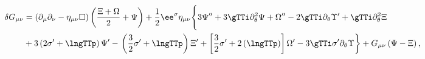 \begin{equation}
\begin{aligned}
\delta G_{\mu \nu} & = \left(\partial_\mu \partial_\nu - \eta_{\mu
\nu} \Box \right) \left( \frac{\Xi + \Omega}{2} + \Psi \right) +
\frac{1}{2} \ee^\sigma \eta_{\mu \nu} \Bigg\{3 \Psi'' + 3 \gTTi
\partial^2_\theta \Psi + \Omega'' - 2 \gTTi \partial_\theta \Upsilon' +
\gTTi \partial_\theta^2 \Xi \\
& + 3 \left(2 \sigma' + \lngTTp \right)
\Psi' - \left. \left(\frac{3}{2} \sigma' + \lngTTp
\right) \Xi' + \left[\frac{3}{2} \sigma' + 2 \left(\lngTTp\right)
\right] \Omega' - 3 \gTTi \sigma' \partial_\theta \Upsilon
\right\} + G_{\mu \nu}  \left(\Psi - \Xi \right),
\end{aligned}
\end{equation}

